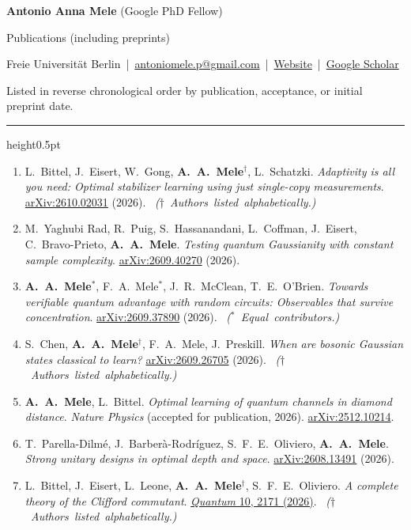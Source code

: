 \documentclass[11pt,a4paper]{article}
\makeatletter
\newcommand{\cvpubitem}[1]{\item #1}
\newcommand{\authornote}[1]{%
  \unskip\ \mbox{\fontsize{9.5}{11.5}\selectfont\color{SoftGray}\textit{(#1)}}%
}
\newcommand{\Header}{%
  \begingroup
  \setlength{\parindent}{0pt}%
  {\fontsize{16}{19}\selectfont\bfseries Antonio Anna Mele}%
  \hfill{\fontsize{10.5}{13}\selectfont\color{SoftGray}(Google PhD Fellow)}\par
  \vspace{2pt}
  {\normalsize Publications (including preprints)}\par
  \vspace{2pt}
  {\footnotesize\color{SoftGray}%
  Freie Universit\"at Berlin \,|\,
  \href{mailto:antoniomele.p@gmail.com}{antoniomele.p@gmail.com} \,|\,
  \href{https://antonioannamele.com/research/}{Website} \,|\,
  \href{https://scholar.google.com/citations?user=IgnTVy4AAAAJ&hl=en}{Google Scholar}
  }\par
  \vspace{3pt}
  {\footnotesize\color{SoftGray}Listed in reverse chronological order by publication, acceptance, or initial preprint date.}\par
  \vspace{0.6em}\color{black}\hrule height0.5pt\vspace{0.4em}
  \endgroup
}
\makeatother
\begin{document}
\thispagestyle{firstpage}
\Header

\begin{enumerate}

\cvpubitem{L.~Bittel, J.~Eisert, W.~Gong, \textbf{A.~A.~Mele}$^{\dagger}$, L.~Schatzki.
\emph{Adaptivity is all you need: Optimal stabilizer learning using just single-copy measurements}.
\href{https://arxiv.org/abs/2610.02031}{arXiv:2610.02031} (2026).
\authornote{$\dagger$ Authors listed alphabetically.}}

\cvpubitem{M.~Yaghubi Rad, R.~Puig, S.~Hassanandani, L.~Coffman, J.~Eisert, C.~Bravo-Prieto, \textbf{A.~A.~Mele}.
\emph{Testing quantum Gaussianity with constant sample complexity}.
\href{https://arxiv.org/abs/2609.40270}{arXiv:2609.40270} (2026).}

\cvpubitem{\textbf{A.~A.~Mele}$^{*}$, F.~A.~Mele$^{*}$, J.~R.~McClean, T.~E.~O'Brien.
\emph{Towards verifiable quantum advantage with random circuits: Observables that survive concentration}.
\href{https://arxiv.org/abs/2609.37890}{arXiv:2609.37890} (2026).
\authornote{$^{*}$ Equal contributors.}}

\cvpubitem{S.~Chen, \textbf{A.~A.~Mele}$^{\dagger}$, F.~A.~Mele, J.~Preskill.
\emph{When are bosonic Gaussian states classical to learn?}
\href{https://arxiv.org/abs/2609.26705}{arXiv:2609.26705} (2026).
\authornote{$\dagger$ Authors listed alphabetically.}}

\cvpubitem{\textbf{A.~A.~Mele}, L.~Bittel.
\emph{Optimal learning of quantum channels in diamond distance}.
\textit{Nature Physics} (accepted for publication, 2026). \href{https://arxiv.org/abs/2512.10214}{arXiv:2512.10214}.}

\cvpubitem{T.~Parella-Dilm\'e, J.~Barber\`a-Rodr\'iguez, S.~F.~E.~Oliviero, \textbf{A.~A.~Mele}.
\emph{Strong unitary designs in optimal depth and space}.
\href{https://arxiv.org/abs/2608.13491}{arXiv:2608.13491} (2026).}

\cvpubitem{L.~Bittel, J.~Eisert, L.~Leone, \textbf{A.~A.~Mele}$^{\dagger}$, S.~F.~E.~Oliviero.
\emph{A complete theory of the Clifford commutant}.
\href{https://quantum-journal.org/papers/q-2026-07-22-2171/}{\textit{Quantum} 10, 2171 (2026)}.
\authornote{$\dagger$ Authors listed alphabetically.}}


\end{enumerate}
\end{document}
